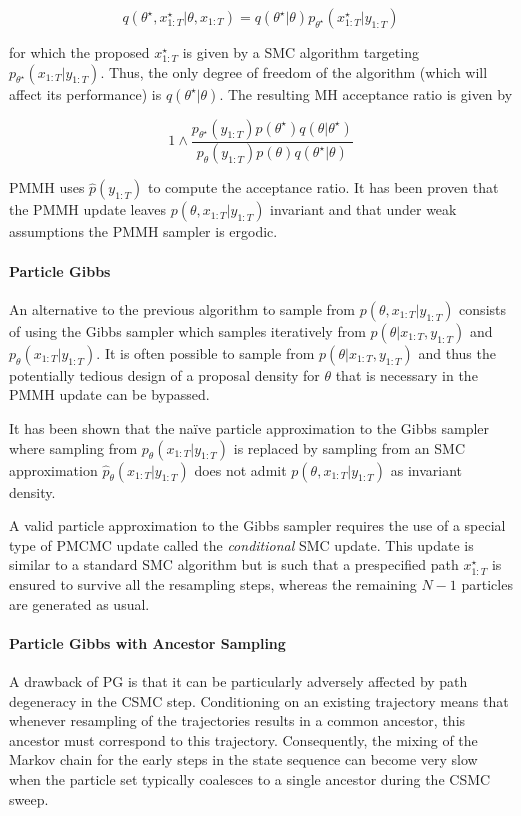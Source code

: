 $$ q\left( \theta^\star, x_{1:T}^\star | \theta, x_{1:T} \right) = q(\theta^\star|\theta) p_{\theta^\star}(x_{1:T}^\star|y_{1:T})$$

for which the proposed $x_{1:T}^\star$ is given by a \gls{SMC} algorithm targeting $p_{\theta^\star}(x_{1:T}|y_{1:T})$. Thus, the only degree of freedom of the algorithm (which will affect its performance) is $q(\theta^\star|\theta)$. The resulting \gls{MH} acceptance ratio is given by

$$ 1 \wedge \frac{p_{\theta^\star}(y_{1:T}) p(\theta^\star) q(\theta|\theta^\star)}{p_{\theta}(y_{1:T}) p(\theta) q(\theta^\star|\theta)} $$

\gls{PMMH} uses $\hat{p}(y_{1:T})$ to compute the acceptance ratio. It has been proven \cite{Andrieu:2010gc} that the \gls{PMMH} update leaves $p(\theta, x_{1:T}|y_{1:T})$ invariant and that under weak assumptions the \gls{PMMH} sampler is ergodic.


\paragraph{Particle Gibbs}
An alternative to the previous algorithm to sample from $p(\theta, x_{1:T}|y_{1:T})$ consists of using the Gibbs sampler which samples iteratively from $p(\theta|x_{1:T},y_{1:T})$ and $p_\theta(x_{1:T}|y_{1:T})$.
It is often possible to sample from $p(\theta|x_{1:T},y_{1:T})$ and thus the potentially tedious design of a proposal density for $\theta$ that is necessary in the \gls{PMMH} update can be bypassed.

It has been shown \cite{Andrieu:2010gc} that the naïve particle approximation to the Gibbs sampler where sampling from $p_\theta(x_{1:T}|y_{1:T})$ is replaced by sampling from an SMC approximation $\hat{p}_\theta(x_{1:T}|y_{1:T})$ does not admit $p(\theta, x_{1:T}|y_{1:T})$ as invariant density.

A valid particle approximation to the Gibbs sampler requires the use of a special type of \gls{PMCMC} update called the \textit{conditional} \gls{SMC} update. This update is similar to a standard \gls{SMC} algorithm but is such that a prespecified path $x^\star_{1:T}$ is ensured to survive all the resampling steps, whereas the remaining $N-1$ particles are generated as usual.

\paragraph{Particle Gibbs with Ancestor Sampling}
A drawback of \gls{PG} is that it can be particularly adversely affected by path degeneracy in the \gls{CSMC} step. Conditioning on an existing trajectory means that whenever resampling of the trajectories results in a common ancestor, this ancestor must correspond to this trajectory. Consequently, the mixing of the Markov chain for the early steps in the state sequence can become very slow when the particle set typically coalesces to a single ancestor during the \gls{CSMC} sweep.

